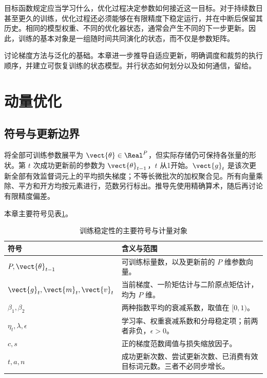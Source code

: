 \documentclass[../textbook.tex]{subfiles}
\begin{document}
\fi
{}

目标函数规定应当学习什么，优化过程决定参数如何接近这一目标。对于持续数日甚至更久的训练，优化过程还必须能够在有限精度下稳定运行，并在中断后保留其历史。相同的模型权重、不同的优化器状态，通常会产生不同的下一步更新。因此，训练的基本对象是一组随时间共同演化的状态，而不仅是参数矩阵。

讨论梯度方法与泛化的基础。本章进一步推导自适应更新，明确调度和裁剪的执行顺序，并建立可恢复训练的状态模型。并行状态如何划分以及如何通信，留给。

\section{动量优化}

\subsection{符号与更新边界}
\begin{assumption}[本章的计量约定]
将全部可训练参数展平为 $\vect{\theta}\in\Real^P$，但实际存储仍可保持各张量的形状。第 $t$ 次成功更新前的参数为 $\vect{\theta}_{t-1}$，$t$ 从1开始。$\vect{g}_t$ 是该次更新全部有效监督词元上的平均损失梯度；不等长微批次的加权聚合见。所有向量乘除、平方和开方均按元素进行，范数另行标出。推导先使用精确算术，随后再讨论有限精度偏差。
\end{assumption}

本章主要符号见表\ref{tab:training-stability-symbols}。
\begin{table}[htbp]
\centering
\caption{训练稳定性的主要符号与计量对象}
\label{tab:training-stability-symbols}
\begin{tabular}{ll}
\toprule
符号 & 含义与范围\\
\midrule
$P,\vect{\theta}_{t-1}$ & 可训练标量数，以及更新前的 $P$ 维参数向量。\\
$\vect{g}_t,\vect{m}_t,\vect{v}_t$ & 当前梯度、一阶矩估计与二阶原点矩估计，均为 $P$ 维。\\
$\beta_1,\beta_2$ & 两种指数平均的衰减系数，取值在 $[0,1)$。\\
$\eta_t,\lambda,\epsilon$ & 学习率、权重衰减系数和分母稳定项；前两者非负，$\epsilon>0$。\\
$c,s$ & 正的梯度范数阈值与损失缩放因子。\\
$t,a,n$ & 成功更新次数、尝试更新次数、已消费有效目标词元数。三者不必同步增长。\\
\bottomrule
\end{tabular}
\end{table}
\end{document}
